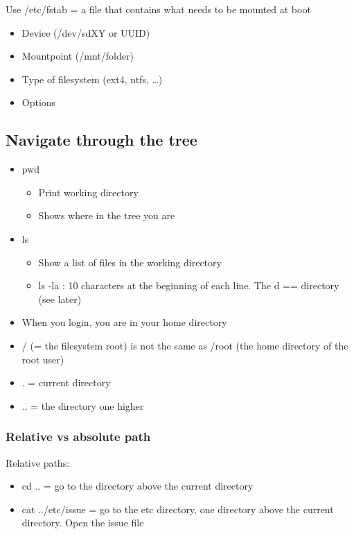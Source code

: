 \documentclass{article}
\begin{document}
Use /etc/fstab = a file that contains what needs to be mounted at boot

\begin{itemize}
    \item Device (/dev/sdXY or UUID) 
    \item Mountpoint (/mnt/folder)
    \item Type of filesystem (ext4, ntfs, \dots)
    \item Options
\end{itemize}


\subsection{Navigate through the tree}

\begin{itemize}
    \item pwd
    \begin{itemize}
        \item Print working directory
        \item Shows where in the tree you are
    \end{itemize}
    \item ls
    \begin{itemize}
        \item Show a list of files in the working directory
        \item ls -la : 10 characters at the beginning of each line. The d == directory (see later)
    \end{itemize}
    \item When you login, you are in your home directory
    \item / (= the filesystem root) is not the same as /root (the home directory of the root user)
    \item . = current directory
    \item .. = the directory one higher
\end{itemize}

\subsubsection{Relative vs absolute path}

Relative paths:

\begin{itemize}
    \item cd .. = go to the directory above the current directory
    \item cat ../etc/issue = go to the etc directory, one directory above the current directory. Open the issue file
\end{itemize}
\end{document}
